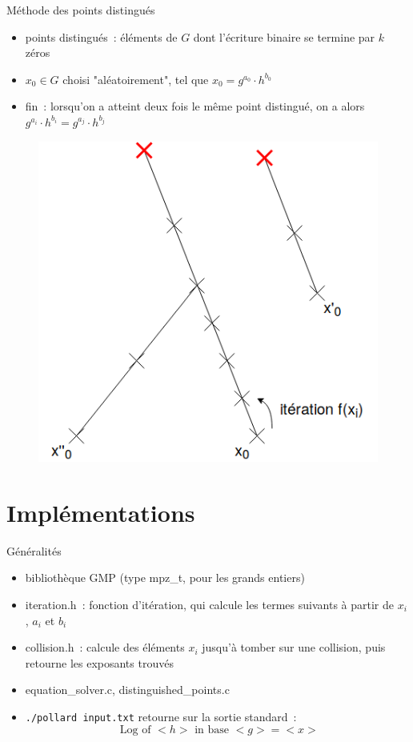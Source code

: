 \documentclass{beamer}
\begin{document}
  \begin{frame}{Méthode des points distingués}
    \begin{itemize}
        \item points distingués~: éléments de $G$ dont l'écriture binaire se termine par $k$ zéros
        \item $x_0 \in G$ choisi "aléatoirement", tel que $x_0 = g^{a_0} \cdot h^{b_0}$
        \item fin~: lorsqu'on a atteint deux fois le même point distingué, on a alors $g^{a_i} \cdot h^{b_i} = g^{a_j} \cdot h^{b_j}$
    \end{itemize}
    \begin{figure}
      \center{}
      \includegraphics[scale=0.3]{images/lambda_distinguished_points.png}
      \caption{}
    \end{figure}
  \end{frame}


  \section{Implémentations}

  \begin{frame}{Généralités}
    \begin{itemize}
        \item bibliothèque GMP (type mpz\_t, pour les grands entiers)
        \item iteration.h~: fonction d'itération, qui calcule les termes suivants à partir de $x_i$, $a_i$ et $b_i$
        \item collision.h~: calcule des éléments $x_i$ jusqu'à tomber sur une collision, puis retourne les exposants trouvés
        \item equation\_solver.c, distinguished\_points.c
        \item \texttt{./pollard input.txt} retourne sur la sortie standard~:
        $$\text{\ Log of } <h> \text{\ in base } <g> = <x>$$
    \end{itemize}
  \end{frame}
\end{document}
